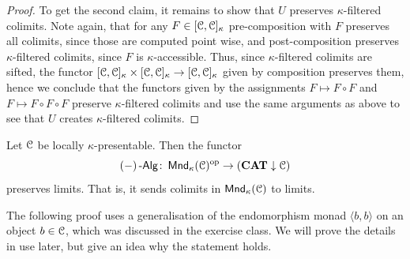 \documentclass[a4paper,11pt,oneside,openany]{scrbook}
\begin{document}
\begin{proof}
	To get the second claim, it remains to show that $U$ preserves
	$\kappa$-filtered colimits. Note again, that for any $F \in [\operatorname{\mathcal{C}},\operatorname{\mathcal{C}}]_{\kappa}$ pre-composition with $F$ preserves all colimits, since those are computed point wise,
	and post-composition preserves $\kappa$-filtered colimits, since $F$ is $\kappa$-accessible.  Thus, since $\kappa$-filtered colimits are sifted, the functor
	$[\operatorname{\mathcal{C}},\operatorname{\mathcal{C}}]_{\kappa} \times [\operatorname{\mathcal{C}},\operatorname{\mathcal{C}}]_{\kappa} \to [\operatorname{\mathcal{C}},\operatorname{\mathcal{C}}]_{\kappa}$ given by
    composition preserves them, hence we conclude that the functors given by the
	assignments $F \mapsto F \circ F$ and $F \mapsto F \circ F \circ F$ preserve $\kappa$-filtered colimits and use the same arguments as above to see that
	$U$ creates $\kappa$-filtered colimits.
\end{proof}

\begin{prop}
	Let $\operatorname{\mathcal{C}}$ be locally $\kappa$-presentable. Then the functor
	\begin{equation*}
		\left(-\right)\operatorname{-\mathsf{Alg}} \colon \operatorname{\mathsf{Mnd}}_{\kappa}(\operatorname{\mathcal{C}})^{\operatorname{\text{op}}} \to ({\normalfont\textbf{CAT}} \downarrow \operatorname{\mathcal{C}})
	\end{equation*}
	preserves limits. That is, it sends colimits in $\operatorname{\mathsf{Mnd}}_{\kappa}(\operatorname{\mathcal{C}})$ to limits.
\end{prop}

The following proof uses a generalisation of the endomorphism monad $\langle b,b\rangle$ on an object $b \in \operatorname{\mathcal{C}}$, which was discussed in the exercise class.
We will prove the details in use later, but give an idea why the statement holds.
\end{document}
